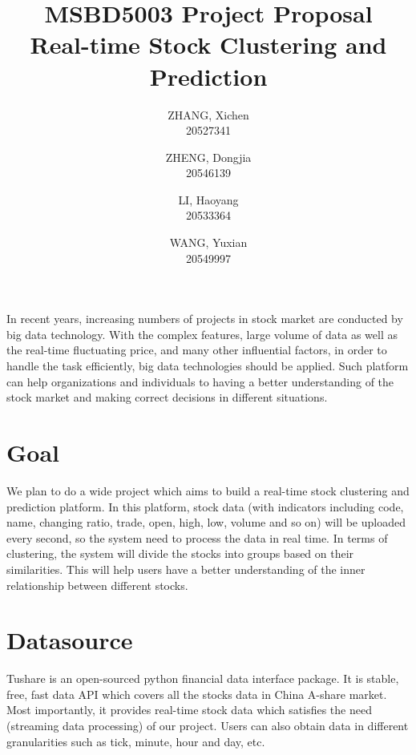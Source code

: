 \documentclass{vgtc}                          %
\title{MSBD5003 Project Proposal\\
Real-time Stock Clustering and Prediction}
\author{ZHANG, Xichen\\ %
        \scriptsize 20527341 %
\and ZHENG, Dongjia\\ %
     \scriptsize 20546139 %
\and LI, Haoyang\\ %
     \scriptsize 20533364 %
\and WANG, Yuxian\\ %
     \scriptsize 20549997
     }
\begin{document}




\maketitle
\noindent In recent years, increasing numbers of projects in stock market are conducted by big data technology. With the complex features, large volume of data as well as the real-time fluctuating price, and many other influential factors, in order to handle the task efficiently, big data technologies should be applied. Such platform can help organizations and individuals to having a better understanding of the stock market and making correct decisions in different situations.

\section{Goal}
\noindent We plan to do a wide project which aims to build a real-time stock clustering and prediction platform. In this platform, stock data (with indicators including code, name, changing ratio, trade, open, high, low, volume and so on) will be uploaded every second, so the system need to process the data in real time. In terms of clustering, the system will divide the stocks into groups based on their similarities. This will help users have a better understanding of the inner relationship between different stocks.


\section{Datasource}
\noindent Tushare is an open-sourced python financial data interface package. It is stable, free, fast data API which covers all the stocks data in China A-share market. Most importantly, it provides real-time stock data which satisfies the need (streaming data processing) of our project. Users can also obtain data in different granularities such as tick, minute, hour and day, etc.\\
 
\end{document}
